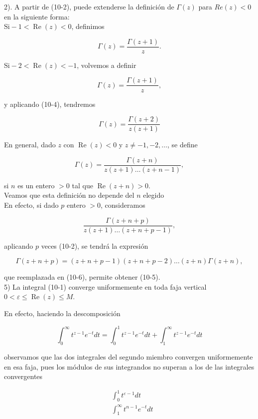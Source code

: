 \documentclass[10pt]{article}
\theoremstyle{plain}
\theoremstyle{definition}
\theoremstyle{remark}
\begin{document}
2). A partir de (10-2), puede extenderse la definición de $\Gamma(z)$ para $R e(z)<0$ en la siguiente forma:\\
$\mathrm{Si}-1<\operatorname{Re}(z)<0$, definimos


\begin{equation*}
\Gamma(z)=\frac{\Gamma(z+1)}{z} . \tag{10-4}
\end{equation*}


$\mathrm{Si}-2<\operatorname{Re}(z)<-1$, volvemos a definir

$$
\Gamma(z)=\frac{\Gamma(z+1)}{z},
$$

y aplicando (10-4), tendremos

$$
\Gamma(z)=\frac{\Gamma(z+2)}{z(z+1)}
$$

En general, dado $z$ con $\operatorname{Re}(z)<0$ y $z \neq-1,-2, \ldots$, se define


\begin{equation*}
\Gamma(z)=\frac{\Gamma(z+n)}{z(z+1) \ldots(z+n-1)}, \tag{10-5}
\end{equation*}


si $n$ es un entero $>0$ tal que $\operatorname{Re}(z+n)>0$.\\
Veamos que esta definición no depende del $n$ elegido\\
En efecto, si dado $p$ entero $>0$, consideramos


\begin{equation*}
\frac{\Gamma(z+n+p)}{z(z+1) \ldots(z+n+p-1)}, \tag{10-6}
\end{equation*}


aplicando $p$ veces (10-2), se tendrá la expresión

$$
\Gamma(z+n+p)=(z+n+p-1)(z+n+p-2) \ldots(z+n) \Gamma(z+n),
$$

que reemplazada en (10-6), permite obtener (10-5).\\
5) La integral (10-1) converge uniformemente en toda faja vertical $0<\varepsilon \leqslant \operatorname{Re}(z) \leqslant M$.

En efecto, haciendo la descomposición

$$
\int_{0}^{\infty} t^{z-1} e^{-t} d t=\int_{0}^{1} t^{z-1} e^{-t} d t+\int_{1}^{\infty} t^{z-1} e^{-t} d t
$$

observamos que las dos integrales del segundo miembro convergen uniformemente en esa faja, pues los módulos de sus integrandos no superan a los de las integrales convergentes

$$
\begin{aligned}
& \int_{0}^{1} t^{\varepsilon-1} d t \\
& \int_{1}^{\infty} t^{n-1} e^{-t} d t
\end{aligned}
$$
\end{document}
